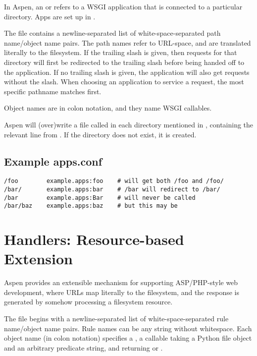 In Aspen, an  or  refers to a WSGI application that is
connected to a particular directory. Apps are set up in .

The  file contains a newline-separated list of
white-space-separated path name/object name pairs. The path names refer to
URL-space, and are translated literally to the filesystem. If the trailing slash
is given, then requests for that directory will first be redirected to the
trailing slash before being handed off to the application. If no trailing slash
is given, the application will also get requests without the slash. When
choosing an application to service a request, the most specific pathname matches
first.

Object names are in colon notation, and they name WSGI callables.

Aspen will (over)write a file called  in each directory
mentioned in , containing the relevant line from
. If the directory does not exist, it is created.


\subsection{Example apps.conf \label{apps.conf}}

\begin{verbatim}
/foo        example.apps:foo    # will get both /foo and /foo/
/bar/       example.apps:bar    # /bar will redirect to /bar/
/bar        example.apps:Bar    # will never be called
/bar/baz    example.apps:baz    # but this may be
\end{verbatim}


\section{Handlers: Resource-based Extension \label{handlers}}

Aspen provides an extensible mechanism for supporting ASP/PHP-style web
development, where URLs map literally to the filesystem, and the response is
generated by somehow processing a filesystem resource.

The  file begins with a newline-separated list of
white-space-separated rule name/object name pairs. Rule names can be any string
without whitespace. Each object name (in colon notation) specifies a ,
a callable taking a Python file object and an arbitrary predicate string, and
returning  or .

